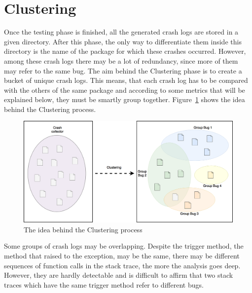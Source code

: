 \section{Clustering}
Once the testing phase is finished, all the generated crash logs are stored in a given directory. After this phase, the only way to differentiate them inside this directory is the name of the package for which these crashes occurred. However, among these crash logs there may be a lot of redundancy, since more of them may refer to the same bug. The aim behind the Clustering phase is to create a bucket of unique crash logs. This means, that each crash log has to be compared with the others	 of the same package and according to some metrics that will be explained below, they must be smartly group together. Figure~\ref{fig: clustering} shows the idea behind the Clustering process. 
\begin{figure}[tb]
\centering 
\includegraphics[width=\columnwidth]{imgs/clusteringidea} 
\caption{The idea behind the Clustering process}
\label{fig: clustering}
\end{figure}

Some groups of crash logs may be overlapping. Despite the trigger method, \ie the method that raised to the exception, may be the same, there may be different sequences of function calls in the stack trace, the more the analysis goes deep. However, they are hardly detectable and is difficult to affirm that two stack traces which have the same trigger method refer to different bugs. 


